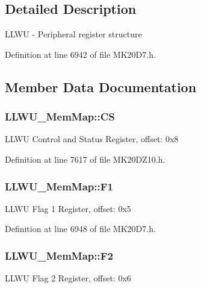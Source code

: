 \subsection{Detailed Description}
L\+L\+WU -\/ Peripheral register structure 

Definition at line 6942 of file M\+K20\+D7.\+h.



\subsection{Member Data Documentation}
\subsubsection[{\texorpdfstring{CS}{CS}}]{ L\+L\+W\+U\+\_\+\+Mem\+Map\+::\+CS}\hypertarget{struct_l_l_w_u___mem_map_ac87c6987805ce2ffa553e315e9ac0804}{}\label{struct_l_l_w_u___mem_map_ac87c6987805ce2ffa553e315e9ac0804}
L\+L\+WU Control and Status Register, offset\+: 0x8 

Definition at line 7617 of file M\+K20\+D\+Z10.\+h.

\subsubsection[{\texorpdfstring{F1}{F1}}]{ L\+L\+W\+U\+\_\+\+Mem\+Map\+::\+F1}\hypertarget{struct_l_l_w_u___mem_map_acb7ec83bb70ec1313cd2e0682b1ee75c}{}\label{struct_l_l_w_u___mem_map_acb7ec83bb70ec1313cd2e0682b1ee75c}
L\+L\+WU Flag 1 Register, offset\+: 0x5 

Definition at line 6948 of file M\+K20\+D7.\+h.

\subsubsection[{\texorpdfstring{F2}{F2}}]{ L\+L\+W\+U\+\_\+\+Mem\+Map\+::\+F2}\hypertarget{struct_l_l_w_u___mem_map_a108405432abc40a34ccbb2c0d7ecfdb4}{}\label{struct_l_l_w_u___mem_map_a108405432abc40a34ccbb2c0d7ecfdb4}
L\+L\+WU Flag 2 Register, offset\+: 0x6 


